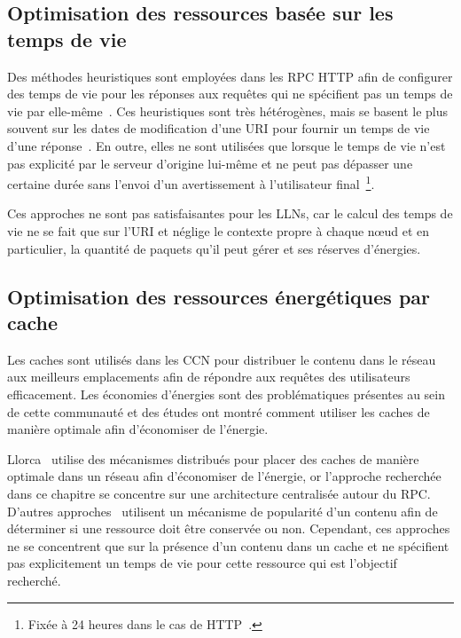 \subsection{Optimisation des ressources basée sur les temps de vie}

Des méthodes heuristiques sont employées dans les \ac{RPC} \ac{HTTP} afin de configurer des temps de vie pour les réponses aux requêtes qui ne spécifient pas un temps de vie par elle-même~\cite{michel1998adaptive}.
Ces heuristiques sont très hétérogènes, mais se basent le plus souvent sur les dates de modification d'une \ac{URI} pour fournir un temps de vie d'une réponse~\cite{gourley2002http}.
En outre, elles ne sont utilisées que lorsque le temps de vie n'est pas explicité par le serveur d'origine lui-même et ne peut pas dépasser une certaine durée sans l'envoi d'un avertissement à l'utilisateur final~\footnote{Fixée à 24 heures dans le cas de \ac{HTTP}~\cite{rfc7234}.}.

Ces approches ne sont pas satisfaisantes pour les \ac{LLN}s, car le calcul des temps de vie ne se fait que sur l'\ac{URI} et néglige le contexte propre à chaque nœud et en particulier, la quantité de paquets qu'il peut gérer et ses réserves d'énergies.

\subsection{Optimisation des ressources énergétiques par cache}

Les caches sont utilisés dans les \ac{CCN} pour distribuer le contenu dans le réseau aux meilleurs emplacements afin de répondre aux requêtes des utilisateurs efficacement.
Les économies d'énergies sont des problématiques présentes au sein de cette communauté et des études ont montré comment utiliser les caches de manière optimale afin d'économiser de l'énergie.

Llorca~\cite{llorca2013dynamic} utilise des mécanismes distribués pour placer des caches de manière optimale dans un réseau afin d'économiser de l'énergie, or l'approche recherchée dans ce chapitre se concentre sur une architecture centralisée autour du \ac{RPC}.
D'autres approches~\cite{li2013energy,choi2012network} utilisent un mécanisme de popularité d'un contenu afin de déterminer si une ressource doit être conservée ou non.
Cependant, ces approches ne se concentrent que sur la présence d'un contenu dans un cache et ne spécifient pas explicitement un temps de vie pour cette ressource qui est l'objectif recherché.

